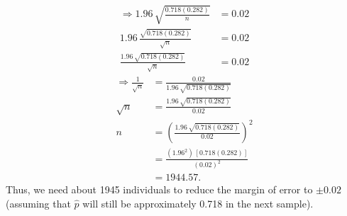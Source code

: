 \documentclass[12pt]{article}
\begin{document}
{\begin{minipage}[t]{0.98\textwidth}
\begin{minipage}[t]{0.47\textwidth}
\begin{enumerate}
\begin{align*}
\Rightarrow 1.96 \, \sqrt{\frac{0.718(0.282)}{n}} &= 0.02\\[0.3cm]
1.96 \, \frac{\sqrt{0.718(0.282)}}{\sqrt{n}} &= 0.02\\[0.3cm]
\frac{1.96 \, \sqrt{0.718(0.282)}}{\sqrt{n}} &= 0.02
\end{align*}
\begin{align*}
\Rightarrow \frac{1}{\sqrt{n}} &= \frac{0.02}{1.96 \, \sqrt{0.718(0.282)}}\\[0.3cm]
\sqrt{n} &= \frac{1.96 \, \sqrt{0.718(0.282)}}{0.02}\\[0.3cm]
n &= \left(\frac{1.96 \, \sqrt{0.718(0.282)}}{0.02}\right)^2\\[0.3cm]
&= \frac{(1.96^2) \, [0.718(0.282)]}{(0.02)^2}\\[0.3cm]
&= 1944.57.
\end{align*}
Thus, we need about 1945 individuals to reduce the margin of error to $\pm 0.02$ (assuming that $\hat p$ will still be approximately 0.718 in the next sample).
\end{enumerate}
\end{minipage}
\end{minipage}}\vspace{0.03\textwidth}
\end{document}
